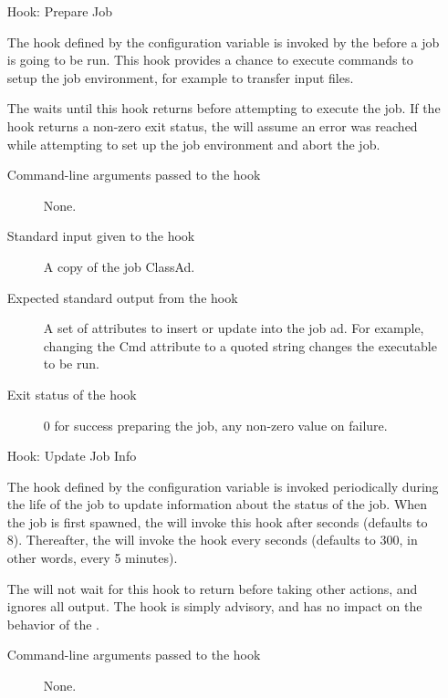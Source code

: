 \begin{itemize}
\item[Hook: Prepare Job]

The hook defined by the configuration variable
 is invoked by the  before
a job is going to be run.
This hook provides a chance to execute commands to setup the job
environment, for example to transfer input files.

The  waits until this hook returns before
attempting to execute the job.
If the hook returns a non-zero exit status, the  will
assume an error was reached while attempting to set up the job
environment and abort the job.

\begin{description}
\item[Command-line arguments passed to the hook]
  None.

\item[Standard input given to the hook]
  A copy of the job ClassAd.

\item[Expected standard output from the hook]
  A set of attributes to insert or update into the job ad.  For example,
  changing the Cmd attribute to a quoted string changes the executable 
  to be run.

\item[Exit status of the hook]
  0 for success preparing the job, any non-zero value on failure.
\end{description}


\item[Hook:  Update Job Info]

The hook defined by the configuration variable
 is invoked periodically during the
life of the job to update information about the status of the job.
When the job is first spawned, the  will invoke this
hook after  seconds
(defaults to 8).
Thereafter, the  will invoke the hook every 
 seconds (defaults to 300,
in other words, every 5 minutes).

The  will not wait for this hook to return before
taking other actions, and ignores all output.
The hook is simply advisory, and has no impact on the behavior of the
.


\begin{description}
\item[Command-line arguments passed to the hook]
  None.


\end{description}
\end{itemize}
